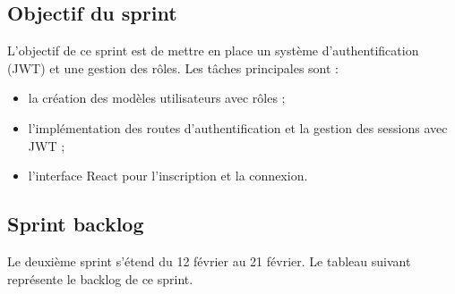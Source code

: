 \subsection{Objectif du sprint}
L'objectif de ce sprint est de mettre en place un système d'authentification (JWT) et une gestion des rôles. Les tâches principales sont :
\begin{itemize}
    \item la création des modèles utilisateurs avec rôles ;
    \item l'implémentation des routes d'authentification et la gestion des sessions avec JWT ;
    \item l'interface React pour l'inscription et la connexion.
\end{itemize}

\subsection{Sprint backlog}
Le deuxième sprint s'étend du 12 février au 21 février. Le tableau suivant représente le backlog de ce sprint.

